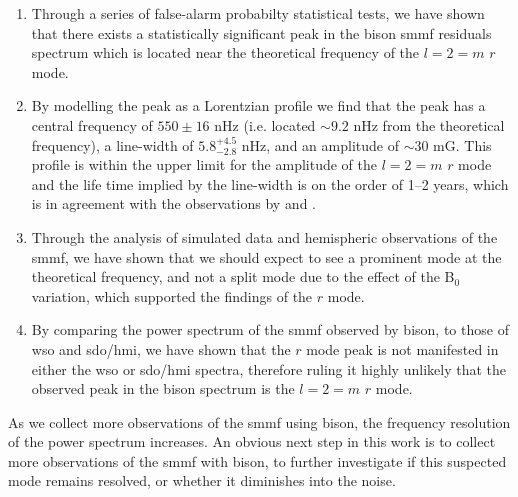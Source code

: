 \begin{enumerate}
	\item{Through a series of false-alarm probabilty statistical tests, we have shown that there exists a statistically significant peak in the \gls{bison} \gls{smmf} residuals spectrum which is located near the theoretical frequency of the $l=2=m$ $r$ mode.}
	
	\item{By modelling the peak as a Lorentzian profile we find that the peak has a central frequency of $550 \pm 16$ nHz (i.e. located $\sim 9.2$ nHz from the theoretical frequency), a line-width of $5.8^{+4.5}_{-2.8}$ nHz, and an amplitude of $\sim 30$ mG. This profile is within the upper limit for the amplitude of the $l=2=m$ $r$ mode and the life time implied by the line-width is on the order of 1--2 years, which is in agreement with the observations by \citet{loptien_global-scale_2018} and \citet{liang_time-distance_2019}.}
	
	\item{Through the analysis of simulated data and hemispheric observations of the \gls{smmf}, we have shown that we should expect to see a prominent mode at the theoretical frequency, and not a split mode due to the effect of the B$_0$ variation, which supported the findings of the $r$ mode.}
	
	\item{By comparing the power spectrum of the \gls{smmf} observed by \gls{bison}, to those of \gls{wso} and \gls{sdo/hmi}, we have shown that the $r$ mode peak is not manifested in either the \gls{wso} or \gls{sdo/hmi} spectra, therefore ruling it highly unlikely that the observed peak in the \gls{bison} spectrum is the $l=2=m$ $r$ mode.}
\end{enumerate}


As we collect more observations of the \gls{smmf} using \gls{bison}, the frequency resolution of the power spectrum increases. An obvious next step in this work is to collect more observations of the \gls{smmf} with \gls{bison}, to further investigate if this suspected mode remains resolved, or whether it diminishes into the noise.